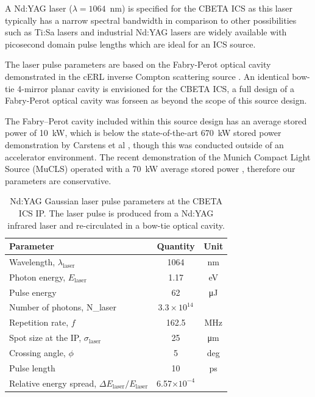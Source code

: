 \documentclass[../main.tex]{subfiles}
\begin{document}
A Nd:YAG laser ($\lambda = 1064$~\si{\nano\meter}) is specified for the CBETA ICS as this laser typically has a narrow spectral bandwidth in comparison to other possibilities such as Ti:Sa lasers and industrial Nd:YAG lasers are widely available with picosecond domain pulse lengths which are ideal for an ICS source.

The laser pulse parameters are based on the Fabry-Perot optical cavity demonstrated in the cERL inverse Compton scattering source \cite{akagi2016narrow}. An identical bow-tie 4-mirror planar cavity is envisioned for the CBETA ICS, a full design of a Fabry-Perot optical cavity was forseen as beyond the scope of this source design.

The Fabry--Perot cavity included within this source design has an average stored power of 10~\si{\kilo\watt}, which is below the state-of-the-art 670~\si{\kilo\watt} stored power demonstration by Carstens et al \cite{carstens2014megawatt}, though this was conducted outside of an accelerator environment. The recent demonstration of the Munich Compact Light Source (MuCLS) operated with a 70~\si{\kilo\watt} average stored power \cite{eggl2016munich}, therefore our parameters are conservative.   
\begin{table}[!h]
\centering
\caption{Nd:YAG Gaussian laser pulse parameters at the CBETA ICS IP. The laser pulse is produced from a Nd:YAG infrared laser and re-circulated in a bow-tie optical cavity.}
\begin{tabular}{lcc}
\hline\hline
Parameter & Quantity & Unit \\
\hline
Wavelength, $\lambda_\textrm{laser}$ & 1064 & \si{\nano\meter}\\
Photon energy, $E_\textrm{laser}$ & 1.17 & \si{\electronvolt}\\
Pulse energy  & 62 & \si{\micro\joule}\\
Number of photons, N_{\textrm{laser}} & $3.3\times 10^{14}$\\ 
Repetition rate, $f$ & 162.5 & \si{\mega\hertz}\\
Spot size at the IP, $\sigma_\textrm{laser}$ & 25 & \si{\micro\meter}\\
Crossing angle, $\phi$ & 5 & deg \\
Pulse length  & 10 & \si{\pico\second}\\
Relative energy spread, $\Delta E_\textrm{laser}/E_\textrm{laser}$ & 6.57$\times 10^{-4}$ &   \\
\hline\hline
\end{tabular}
\label{TABLE:CBETA_laser_pulse_design_parameters}
\end{table}
\end{document}
